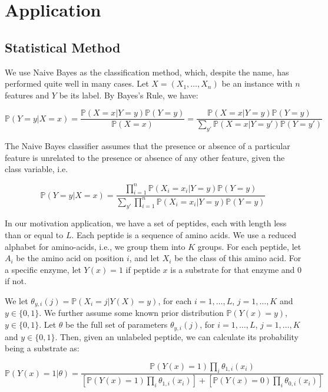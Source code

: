 \documentclass[12pt]{article}
\newcommand{\Prob}{\mathbb{P}}
\begin{document}
\section{Application}
\subsection{Statistical Method}

We use Naive Bayes as the classification method, which, despite the name, has performed quite well in many cases. Let $X=(X_1,\ldots,X_n)$ be an instance with $n$ features and $Y$ be its label. By Bayes's Rule, we have:

\begin{equation*}
\Prob(Y=y|X=x)=\frac{\Prob(X=x|Y=y)\Prob(Y=y)}{\Prob(X=x)}=\frac{\Prob(X=x|Y=y)\Prob(Y=y)}{\sum_{y'}\Prob(X=x|Y=y')\Prob(Y=y')}
\end{equation*}

The Naive Bayes classifier assumes that the presence or absence of a particular feature is unrelated to the presence or absence of any other feature, given the class variable, i.e.

\begin{equation*}
\Prob(Y=y|X=x) = \frac{\prod_{i=1}^n\Prob(X_i=x_i|Y=y)\Prob(Y=y)}{\sum_{y'}\prod_{i=1}^n\Prob(X_i=x_i|Y=y)\Prob(Y=y)}
\end{equation*}

In our motivation application, we have a set of peptides, each with length less than or equal to $L$. Each peptide is a sequence of amino acids. We use a reduced alphabet for amino-acids, i.e., we group them into $K$ groups. For each peptide, let $A_i$ be the amino acid on position $i$, and let $X_i$ be the class of this amino acid. For a specific enzyme, let $Y(x)=1$ if peptide $x$ is a substrate for that enzyme and 0 if not.

We let $\theta_{y,i}(j)=\Prob(X_i=j|Y(X)=y)$, for each $i=1,\ldots,L$, $j=1,\ldots,K$ and $y\in\{0,1\}$. We further assume some known prior distribution $\Prob(Y(x)=y)$, $y\in\{0,1\}$. Let $\theta$ be the full set of parameters $\theta_{y,i}(j)$, for $i=1,\ldots,L$, $j=1,\ldots,K$ and $y\in\{0,1\}$. Then, given an unlabeled peptide, we can calculate its probability being a substrate as:

\begin{equation*} 
  \Prob\left(Y(x) = 1 | \theta\right) =
  \frac{\Prob(Y(x)=1) \prod_{i} \theta_{1,i}(x_i)}{
  \left[ \Prob(Y(x)=1) \prod_{i} \theta_{1,i}(x_i)\right] +
  \left[ \Prob(Y(x)=0) \prod_{i} \theta_{0,i}(x_i)\right]}
\end{equation*}
\end{document}
